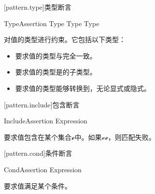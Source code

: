 [pattern.type]{类型断言}

\begin{bnf}{TypeAssertion}
     Type \br
    \terminal{:} Type \br
     Type
\end{bnf}

\pnum
{}对值的类型进行约束。它包括以下类型：

\begin{itemize}
    \item {}要求值的类型与完全一致。
    \item {}要求值的类型是的子类型。
    \item {}要求值的类型能够转换到，无论显式或隐式。
    \end{itemize}

[pattern.include]{包含断言}

\begin{bnf}{IncludeAssertion}
     Expression
\end{bnf}

\pnum
{}要求值包含在某个集合$\mathcal{e}$中。如果$\mathcal{v}$$\mathcal{e}$，则匹配失败。

[pattern.cond]{条件断言}

\begin{bnf}{CondAssertion}
     Expression
\end{bnf}

\pnum
{}要求值满足某个条件。